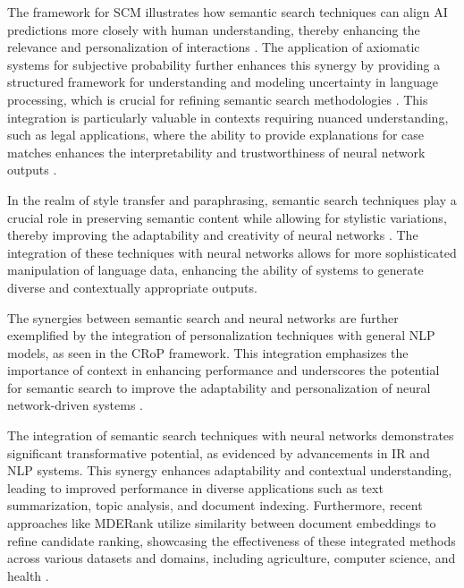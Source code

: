 The framework for SCM illustrates how semantic search techniques can align AI predictions more closely with human understanding, thereby enhancing the relevance and personalization of interactions \cite{lin2023interpretabilityframeworksimilarcase}. The application of axiomatic systems for subjective probability further enhances this synergy by providing a structured framework for understanding and modeling uncertainty in language processing, which is crucial for refining semantic search methodologies \cite{cieslinski2022axiomstypefreesubjectiveprobability}. This integration is particularly valuable in contexts requiring nuanced understanding, such as legal applications, where the ability to provide explanations for case matches enhances the interpretability and trustworthiness of neural network outputs \cite{lin2023interpretabilityframeworksimilarcase}.

In the realm of style transfer and paraphrasing, semantic search techniques play a crucial role in preserving semantic content while allowing for stylistic variations, thereby improving the adaptability and creativity of neural networks \cite{yamshchikov2020styletransferparaphraselookingsensible}. The integration of these techniques with neural networks allows for more sophisticated manipulation of language data, enhancing the ability of systems to generate diverse and contextually appropriate outputs.

The synergies between semantic search and neural networks are further exemplified by the integration of personalization techniques with general NLP models, as seen in the CRoP framework. This integration emphasizes the importance of context in enhancing performance and underscores the potential for semantic search to improve the adaptability and personalization of neural network-driven systems \cite{kaur2024cropcontextwiserobuststatic}.

The integration of semantic search techniques with neural networks demonstrates significant transformative potential, as evidenced by advancements in IR and NLP systems. This synergy enhances adaptability and contextual understanding, leading to improved performance in diverse applications such as text summarization, topic analysis, and document indexing. Furthermore, recent approaches like MDERank utilize similarity between document embeddings to refine candidate ranking, showcasing the effectiveness of these integrated methods across various datasets and domains, including agriculture, computer science, and health \cite{ginzburg2021selfsuperviseddocumentsimilarityranking,altuncu2022improvingperformanceautomatickeyword}.

